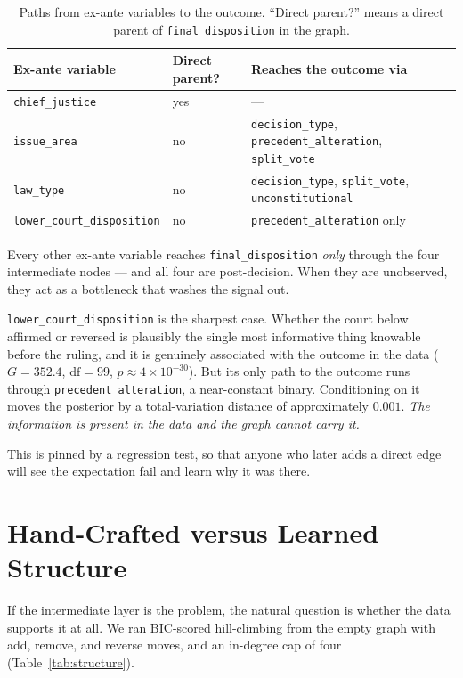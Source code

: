 \documentclass[11pt]{article}
\newcommand{\dispo}{\texttt{final\_disposition}}
\newcommand{\code}[1]{\texttt{#1}}
\begin{document}
\begin{table}[t]
\centering
\caption{Paths from ex-ante variables to the outcome. ``Direct parent?'' means a
direct parent of \dispo{} in the graph.}
\label{tab:bottleneck}
\footnotesize
\setlength{\tabcolsep}{5pt}
\begin{tabular}{llp{}}
\toprule
Ex-ante variable & Direct parent? & Reaches the outcome via \\
\midrule
\code{chief\_justice}            & yes & --- \\
\code{issue\_area}               & no  & \code{decision\_type}, \code{precedent\_alteration}, \code{split\_vote} \\
\code{law\_type}                 & no  & \code{decision\_type}, \code{split\_vote}, \code{unconstitutional} \\
\code{lower\_court\_disposition} & no  & \code{precedent\_alteration} only \\
\bottomrule
\end{tabular}
\end{table}

Every other ex-ante variable reaches \dispo{} \emph{only} through the four
intermediate nodes --- and all four are post-decision. When they are unobserved,
they act as a bottleneck that washes the signal out.

\code{lower\_court\_disposition} is the sharpest case. Whether the court below
affirmed or reversed is plausibly the single most informative thing knowable
before the ruling, and it is genuinely associated with the outcome in the data
($G = 352.4$, $\mathrm{df} = 99$, $p \approx 4 \times 10^{-30}$). But its only
path to the outcome runs through \code{precedent\_alteration}, a near-constant
binary. Conditioning on it moves the posterior by a total-variation distance of
approximately $0.001$. \emph{The information is present in the data and the
graph cannot carry it.}

This is pinned by a regression test, so that anyone who later adds a direct edge
will see the expectation fail and learn why it was there.

\section{Hand-Crafted versus Learned Structure}
\label{sec:structure}

If the intermediate layer is the problem, the natural question is whether the
data supports it at all. We ran BIC-scored hill-climbing from the empty graph
with add, remove, and reverse moves, and an in-degree cap of four
(Table~\ref{tab:structure}).
\end{document}
